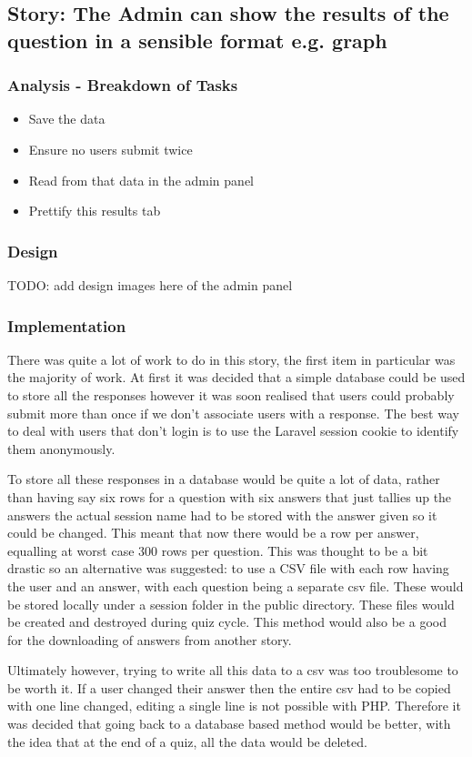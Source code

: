 \subsection{Story: The Admin can show the results of the question in a sensible format e.g. graph}
\subsubsection{Analysis - Breakdown of Tasks}
\begin{itemize}
	\item Save the data
	\item Ensure no users submit twice
	\item Read from that data in the admin panel
	\item Prettify this results tab
\end{itemize}
\subsubsection{Design}
TODO: add design images here of the admin panel
\subsubsection{Implementation}
There was quite a lot of work to do in this story, the first item in particular was the majority of work. At first it was decided that a simple database could be used to store all the responses however it was soon realised that users could probably submit more than once if we don't associate users with a response. The best way to deal with users that don't login is to use the Laravel session cookie to identify them anonymously.

To store all these responses in a database would be quite a lot of data, rather than having say six rows for a question with six answers that just tallies up the answers the actual session name had to be stored with the answer given so it could be changed. This meant that now there would be a row per answer, equalling at worst case 300 rows per question. This was thought to be a bit drastic so an alternative was suggested: to use a CSV file with each row having the user and an answer, with each question being a separate csv file. These would be stored locally under a session folder in the public directory. These files would be created and destroyed during quiz cycle. This method would also be a good for the downloading of answers from another story. 

Ultimately however, trying to write all this data to a csv was too troublesome to be worth it. If a user changed their answer then the entire csv had to be copied with one line changed, editing a single line is not possible with PHP. Therefore it was decided that going back to a database based method would be better, with the idea that at the end of a quiz, all the data would be deleted.

